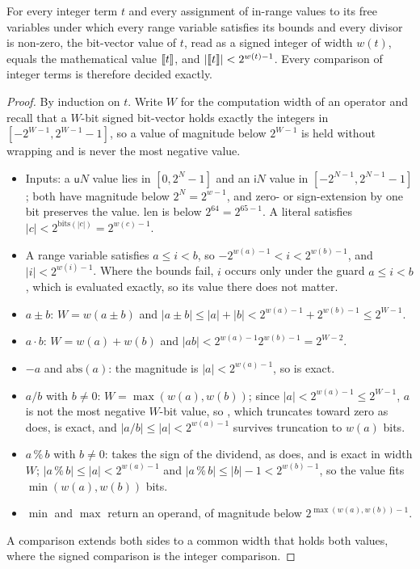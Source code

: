 \begin{theorem}\label{thm:widths}
For every integer term $t$ and every assignment of in-range values to its free variables under
which every range variable satisfies its bounds and every divisor is non-zero, the bit-vector
value of $t$, read as a signed integer of width $w(t)$, equals the mathematical value
$\llbracket t \rrbracket$, and $|\llbracket t \rrbracket|<2^{w(t)-1}$. Every comparison of integer terms is therefore decided
exactly.
\end{theorem}
\begin{proof}
By induction on $t$. Write $W$ for the computation width of an operator and recall that a
$W$-bit signed bit-vector holds exactly the integers in $[-2^{W-1},2^{W-1}-1]$, so a value of
magnitude below $2^{W-1}$ is held without wrapping and is never the most negative value.
\begin{itemize}
\item Inputs: a $\mathsf{u}N$ value lies in $[0,2^N-1]$ and an $\mathsf{i}N$ value in
  $[-2^{N-1},2^{N-1}-1]$; both have magnitude below $2^N=2^{w-1}$, and zero- or sign-extension
  by one bit preserves the value. $\mathrm{len}$ is below $2^{64}=2^{65-1}$. A literal satisfies
  $|c|<2^{\mathrm{bits}(|c|)}=2^{w(c)-1}$.
\item A range variable satisfies $a\le i<b$, so $-2^{w(a)-1}<i<2^{w(b)-1}$, and
  $|i|<2^{w(i)-1}$. Where the bounds fail, $i$ occurs only under the guard
  $a\le i<b$, which is evaluated exactly, so its value there does not matter.
\item $a\pm b$: $W=w(a\pm b)$ and $|a\pm b|\le|a|+|b|<2^{w(a)-1}+2^{w(b)-1}\le2^{W-1}$.
\item $a\cdot b$: $W=w(a)+w(b)$ and $|ab|<2^{w(a)-1}2^{w(b)-1}=2^{W-2}$.
\item $-a$ and $\mathrm{abs}(a)$: the magnitude is $|a|<2^{w(a)-1}$, so  is exact.
\item $a/b$ with $b\neq0$: $W=\max(w(a),w(b))$; since $|a|<2^{w(a)-1}\le2^{W-1}$, $a$ is not
  the most negative $W$-bit value, so , which truncates toward zero as  does,
  is exact, and $|a/b|\le|a|<2^{w(a)-1}$ survives truncation to $w(a)$ bits.
\item $a\mathbin{\%}b$ with $b\neq0$:  takes the sign of the dividend, as 
  does, and is exact in width $W$; $|a\mathbin{\%}b|\le|a|<2^{w(a)-1}$ and
  $|a\mathbin{\%}b|\le|b|-1<2^{w(b)-1}$, so the value fits $\min(w(a),w(b))$ bits.
\item $\min$ and $\max$ return an operand, of magnitude below $2^{\max(w(a),w(b))-1}$.
\end{itemize}
A comparison extends both sides to a common width that holds both values, where the signed
comparison is the integer comparison.
\end{proof}

